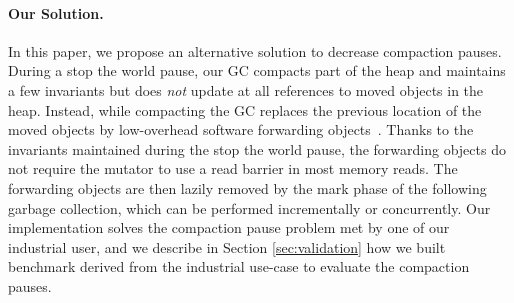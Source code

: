 \documentclass[sigplan,10pt,review,anonymous]{acmart}\settopmatter{printfolios=true,printccs=false,printacmref=false}
\begin{document}



\paragraph{Our Solution.} 
In this paper, we propose an alternative solution to decrease compaction pauses. During a stop the world pause, our GC compacts part of the heap and maintains a few invariants but does \emph{not} update at all references to moved objects in the heap. Instead, while compacting the GC replaces the previous location of the moved objects by low-overhead software forwarding objects~\cite{Forwarders}. Thanks to the invariants maintained during the stop the world pause, the forwarding objects do not require the mutator to use a read barrier in most memory reads. The forwarding objects are then lazily removed by the mark phase of the following garbage collection, which can be performed incrementally or concurrently. Our implementation solves the compaction pause problem met by one of our industrial user, and we describe in Section \ref{sec:validation} how we built benchmark derived from the industrial use-case to evaluate the compaction pauses. %
\end{document}
